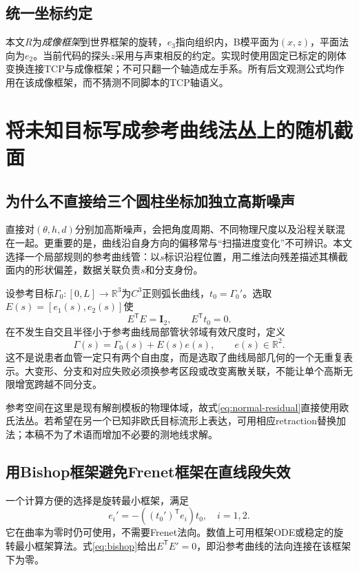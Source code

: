 \documentclass[UTF8,11pt,a4paper,fontset=fandol]{ctexart}
\numberwithin{equation}{section}
\theoremstyle{plain}
\theoremstyle{definition}
\theoremstyle{remark}
\newcommand{\R}{\mathbb R}\newcommand{\E}{\mathbb E}
\newcommand{\Id}{\mathbf I}\newcommand{\T}{^{\mathsf T}}
\begin{document}
\subsection{统一坐标约定}
本文$R$为\emph{成像框架}到世界框架的旋转，$e_3$指向组织内，B模平面为$(x,z)$，平面法向为$e_2$。当前代码的探头$z$采用与声束相反的约定。实现时使用固定已标定的刚体变换连接TCP与成像框架；不可只翻一个轴造成左手系。所有后文观测公式均作用在该成像框架，而不猜测不同脚本的TCP轴语义。

\section{将未知目标写成参考曲线法丛上的随机截面}\label{sec:bundle}
\subsection{为什么不直接给三个圆柱坐标加独立高斯噪声}
直接对$(\theta,h,d)$分别加高斯噪声，会把角度周期、不同物理尺度以及沿程关联混在一起。更重要的是，曲线沿自身方向的偏移常与“扫描进度变化”不可辨识。本文选择一个局部规则的参考曲线管：以$s$标识沿程位置，用二维法向残差描述其横截面内的形状偏差，数据关联负责$s$和分支身份。

设参考目标$\Gamma_0:[0,L]\to\R^3$为$C^3$正则弧长曲线，$t_0=\Gamma_0'$。选取$E(s)=[e_1(s),e_2(s)]$使
\begin{equation}
 E\T E=\Id_2,\qquad E\T t_0=0.
\end{equation}
在不发生自交且半径小于参考曲线局部管状邻域有效尺度时，定义
\begin{equation}
 \boxed{\Gamma(s)=\Gamma_0(s)+E(s)e(s),\qquad e(s)\in\R^2.}
 \label{eq:normal-residual}
\end{equation}
这不是说患者血管一定只有两个自由度，而是选取了曲线局部几何的一个无重复表示。大变形、分支和对应失败必须换参考区段或改变离散关联，不能让单个高斯无限增宽跨越不同分支。

参考空间在这里是现有解剖模板的物理体域，故式\eqref{eq:normal-residual}直接使用欧氏法丛。若希望在另一个已知非欧氏目标流形上表达，可用相应retraction替换加法；本稿不为了术语而增加不必要的测地线求解。

\subsection{用Bishop框架避免Frenet框架在直线段失效}
一个计算方便的选择是旋转最小框架，满足
\begin{equation}
 e_i'=-((t_0')\T e_i)t_0,\quad i=1,2.
 \label{eq:bishop}
\end{equation}
它在曲率为零时仍可使用，不需要Frenet法向。数值上可用框架ODE或稳定的旋转最小框架算法\cite{Wang2008}。式\eqref{eq:bishop}给出$E\T E'=0$，即沿参考曲线的法向连接在该框架下为零。
\end{document}
